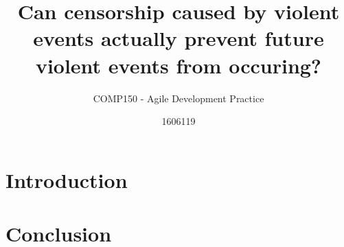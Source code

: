 \documentclass{scrartcl}
\title{Can censorship caused by violent events actually prevent future violent events from occuring?}
\subtitle{COMP150 - Agile Development Practice}
\author{1606119}
\begin{document}
\maketitle

\abstract{} 

\section{Introduction}




\section{}



\section{}



\section{Conclusion}










\end{document}
